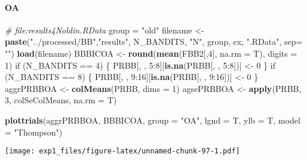 \documentclass[11pt,,]{article}
\newenvironment{Shaded}{\begin{snugshade}}{\end{snugshade}}
\newcommand{\KeywordTok}[1]{\textcolor[rgb]{0.13,0.29,0.53}{\textbf{{#1}}}}
\newcommand{\DataTypeTok}[1]{\textcolor[rgb]{0.13,0.29,0.53}{{#1}}}
\newcommand{\DecValTok}[1]{\textcolor[rgb]{0.00,0.00,0.81}{{#1}}}
\newcommand{\StringTok}[1]{\textcolor[rgb]{0.31,0.60,0.02}{{#1}}}
\newcommand{\CommentTok}[1]{\textcolor[rgb]{0.56,0.35,0.01}{\textit{{#1}}}}
\newcommand{\NormalTok}[1]{{#1}}
\let\oldparagraph\paragraph
\renewcommand{\paragraph}[1]{\oldparagraph{#1}\mbox{}}
\begin{document}
\newpage

\paragraph{OA}\label{oa-1}

\begin{Shaded}
\begin{Highlighting}[]
\CommentTok{# file:results4Noldin.RData}
\NormalTok{group =}\StringTok{ "old"}
\NormalTok{filename  <-}\StringTok{ }\KeywordTok{paste}\NormalTok{(}\StringTok{"../processed/BB"}\NormalTok{,}\StringTok{"results"}\NormalTok{, N_BANDITS, }\StringTok{"N"}\NormalTok{, }
                   \NormalTok{group, ex, }\StringTok{".RData"}\NormalTok{, }\DataTypeTok{sep=} \StringTok{""}\NormalTok{)}
\KeywordTok{load}\NormalTok{(filename)}
\NormalTok{BBBICOA <-}\StringTok{ }\KeywordTok{round}\NormalTok{(}\KeywordTok{mean}\NormalTok{(FBB2[,}\DecValTok{4}\NormalTok{], }\DataTypeTok{na.rm =} \NormalTok{T), }\DataTypeTok{digits =} \DecValTok{1}\NormalTok{)}
\NormalTok{if (N_BANDITS ==}\StringTok{ }\DecValTok{4}\NormalTok{) \{}
    \NormalTok{PRBB[, , }\DecValTok{5}\NormalTok{:}\DecValTok{8}\NormalTok{][}\KeywordTok{is.na}\NormalTok{(PRBB[, , }\DecValTok{5}\NormalTok{:}\DecValTok{8}\NormalTok{])] <-}\StringTok{ }\DecValTok{0}
\NormalTok{\}}
\NormalTok{if (N_BANDITS ==}\StringTok{ }\DecValTok{8}\NormalTok{) \{}
    \NormalTok{PRBB[, , }\DecValTok{9}\NormalTok{:}\DecValTok{16}\NormalTok{][}\KeywordTok{is.na}\NormalTok{(PRBB[, , }\DecValTok{9}\NormalTok{:}\DecValTok{16}\NormalTok{])] <-}\StringTok{ }\DecValTok{0}
\NormalTok{\}}
\NormalTok{aggrPRBBOA  <-}\StringTok{ }\KeywordTok{colMeans}\NormalTok{(PRBB, }\DataTypeTok{dims =} \DecValTok{1}\NormalTok{) }
\NormalTok{agsePRBBOA <-}\StringTok{ }\KeywordTok{apply}\NormalTok{(PRBB, }\DecValTok{3}\NormalTok{, colSeColMeans, }\DataTypeTok{na.rm =} \NormalTok{T) }
\end{Highlighting}
\end{Shaded}

\begin{Shaded}
\begin{Highlighting}[]
\KeywordTok{plottrials}\NormalTok{(aggrPRBBOA, BBBICOA, }\DataTypeTok{group =} \StringTok{"OA"}\NormalTok{, }\DataTypeTok{lgnd =} \NormalTok{T, }\DataTypeTok{ylb =} \NormalTok{T, }\DataTypeTok{model =} \StringTok{"Thompson"}\NormalTok{)}
\end{Highlighting}
\end{Shaded}

\texttt{[image: exp1\_files/figure-latex/unnamed-chunk-97-1.pdf]}
\end{document}
